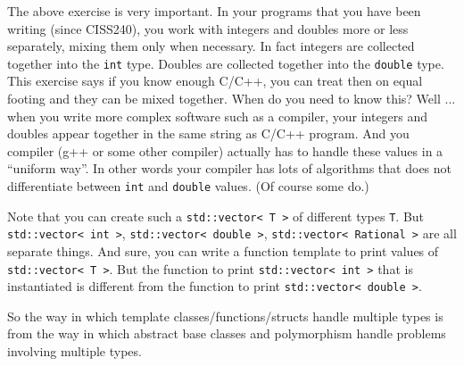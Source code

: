 


The above exercise is very important. In your programs that you have been writing (since CISS240), you work with integers and doubles more or less separately, mixing them only when necessary. In fact integers are collected together into the \verb!int! type. Doubles are collected together into the \verb!double! type. This exercise says if you know enough C/C++, you can treat then on equal footing and they can be mixed together. When do you need to know this? Well ... when you write more complex software such as a compiler, your integers and doubles appear together in the same string as C/C++ program. And you compiler (g++ or some other compiler) actually has to handle these values in a ``uniform way''. In other words your compiler has lots of algorithms that does not differentiate between \verb!int! and \verb!double! values. (Of course some do.)

Note that you can create such a \verb!std::vector< T >! of different types \verb!T!. But \verb!std::vector< int >!, \verb!std::vector< double >!, \verb!std::vector< Rational >! are all separate things. And sure, you can write a function template to print values of \verb!std::vector< T >!. But the function to print \verb!std::vector< int >! that is instantiated is different from the function to print \verb!std::vector< double >!.

So the way in which template classes/functions/structs handle multiple
types is  from the way in which abstract base
classes and polymorphism handle problems involving multiple types.





             

